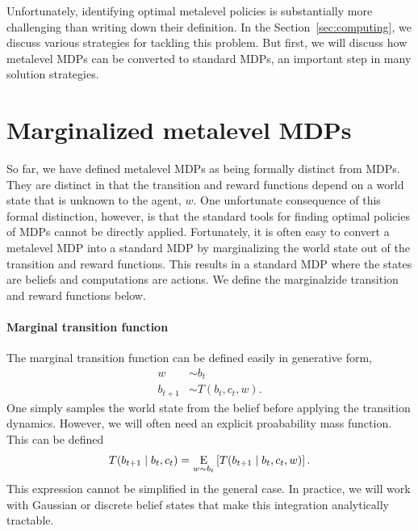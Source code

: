 Unfortunately, identifying optimal metalevel policies is substantially more challenging than writing down their definition. In the Section~\ref{sec:computing}, we discuss various strategies for tackling this problem. But first, we will discuss how metalevel MDPs can be converted to standard MDPs, an important step in many solution strategies.



\section{Marginalized metalevel MDPs}\label{sec:metamdp-marginalized}

So far, we have defined metalevel MDPs as being formally distinct from MDPs. They are distinct in that the transition and reward functions depend on a world state that is unknown to the agent, $w$. One unfortunate consequence of this formal distinction, however, is that the standard tools for finding optimal policies of MDPs cannot be directly applied. Fortunately, it is often easy to convert a metalevel MDP into a standard MDP by marginalizing the world state out of the transition and reward functions. This results in a standard MDP where the states are beliefs and computations are actions. We define the marginalzide transition and reward functions below.

\paragraph{Marginal transition function}
The marginal transition function can be defined easily in generative form,
%
\begin{equation}
\begin{aligned}
  w  &\sim b_t\\
  b_{t+1} &\sim T(b_t, c_t, w).
\end{aligned}
\end{equation}
%
One simply samples the world state from the belief before applying the transition dynamics. However, we will often need an explicit proabability mass function. This can be defined
%
\begin{equation}
T(b_{t+1} \mid b_t, c_t) = \expectunder{T(b_{t+1} \mid b_t, c_t, w)}{w \sim b_t}.
\end{equation}
This expression cannot be simplified in the general case. In practice, we will work with Gaussian or discrete belief states that make this integration analytically tractable.


